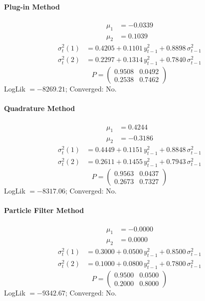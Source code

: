 \documentclass[11pt, a4paper]{article}
\begin{document}
\paragraph{Plug-in Method}
\begin{align}
\mu_{1} &= -0.0339 \\
\mu_{2} &= 0.1039
\end{align}
\begin{align}
\sigma^2_{t}(1) &= 0.4205 + 0.1101\, y_{t-1}^2 + 0.8898\, \sigma^2_{t-1} \\
\sigma^2_{t}(2) &= 0.2297 + 0.1314\, y_{t-1}^2 + 0.7840\, \sigma^2_{t-1}
\end{align}
\begin{equation}
P = \begin{pmatrix} 0.9508 & 0.0492 \\ 0.2538 & 0.7462 \end{pmatrix}
\end{equation}
LogLik $= -8269.21$; Converged: No.

\paragraph{Quadrature Method}
\begin{align}
\mu_{1} &= 0.4244 \\
\mu_{2} &= -0.3186
\end{align}
\begin{align}
\sigma^2_{t}(1) &= 0.4449 + 0.1151\, y_{t-1}^2 + 0.8848\, \sigma^2_{t-1} \\
\sigma^2_{t}(2) &= 0.2611 + 0.1455\, y_{t-1}^2 + 0.7943\, \sigma^2_{t-1}
\end{align}
\begin{equation}
P = \begin{pmatrix} 0.9563 & 0.0437 \\ 0.2673 & 0.7327 \end{pmatrix}
\end{equation}
LogLik $= -8317.06$; Converged: No.

\paragraph{Particle Filter Method}
\begin{align}
\mu_{1} &= -0.0000 \\
\mu_{2} &= 0.0000
\end{align}
\begin{align}
\sigma^2_{t}(1) &= 0.3000 + 0.0500\, y_{t-1}^2 + 0.8500\, \sigma^2_{t-1} \\
\sigma^2_{t}(2) &= 0.1000 + 0.0800\, y_{t-1}^2 + 0.7800\, \sigma^2_{t-1}
\end{align}
\begin{equation}
P = \begin{pmatrix} 0.9500 & 0.0500 \\ 0.2000 & 0.8000 \end{pmatrix}
\end{equation}
LogLik $= -9342.67$; Converged: No.
\end{document}
